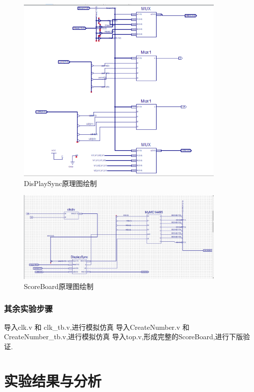 \documentclass{article}
\begin{document}
    \begin{figure}[H]
    \centering
    \includegraphics[width=0.9\textwidth]{lab7/7.png}
    \caption{\label{Lab7}DisPlaySync原理图绘制}
    \end{figure}

    \begin{figure}[H]
    \centering
    \includegraphics[width=0.9\textwidth]{lab7/6.png}
    \caption{\label{Lab7}ScoreBoard原理图绘制}
    \end{figure}

\subsubsection*{其余实验步骤}
导入clk.v 和 clk\_tb.v,进行模拟仿真
导入CreateNumber.v 和 CreateNumber\_tb.v,进行模拟仿真
导入top.v,形成完整的ScoreBoard,进行下版验证.



\section{实验结果与分析}
\end{document}
